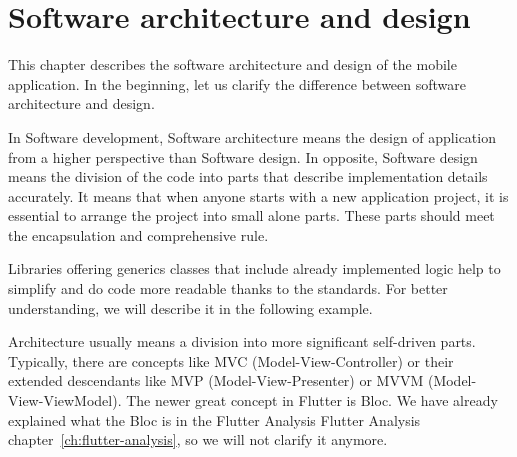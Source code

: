 \chapter{Software architecture and design}\label{ch:software-architecture-and-design}
This chapter describes the software architecture and design of the mobile application.
In the beginning, let us clarify the difference between software architecture and design.

In Software development, Software architecture means the design of application from a higher perspective than Software design.
In opposite, Software design means the division of the code into parts that describe implementation details accurately.
It means that when anyone starts with a new application project, it is essential to arrange the project into small alone parts.
These parts should meet the encapsulation and comprehensive rule.

Libraries offering generics classes that include already implemented logic help to simplify and do code more readable thanks to the standards.
For better understanding, we will describe it in the following example.

Architecture usually means a division into more significant self-driven parts.
Typically, there are concepts like MVC (Model-View-Controller) or their extended descendants like MVP (Model-View-Presenter) or MVVM (Model- View-ViewModel).
The newer great concept in Flutter is Bloc.
We have already explained what the Bloc is in the Flutter Analysis Flutter Analysis chapter~\ref{ch:flutter-analysis}, so we will not clarify it anymore.



